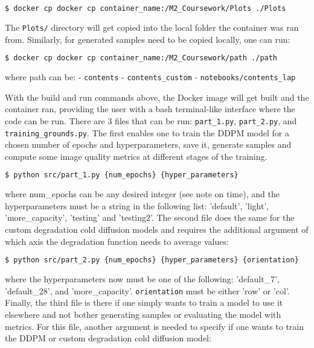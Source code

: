 \documentclass[12pt]{report} %
\begin{document}
\begin{lstlisting}[language=bash]
$ docker cp docker cp container_name:/M2_Coursework/Plots ./Plots
\end{lstlisting}

The \texttt{Plots/} directory will get copied into the local folder the container was ran from. Similarly, for generated samples need to be copied locally, one can run:

\begin{lstlisting}[language=bash]
$ docker cp docker cp container_name:/M2_Coursework/path ./path
\end{lstlisting}
where path can be:
- \texttt{contents}
- \texttt{contents\_custom}
- \texttt{notebooks/contents\_lap}


With the build and run commands above, the Docker image will get built and the container ran, providing the user with a bash terminal-like interface where the code can be run. There are 3 files that can be run: \texttt{part\_1.py}, \texttt{part\_2.py}, and \texttt{training\_grounds.py}. The first enables one to train the DDPM model for a chosen number of epochs and hyperparameters, save it, generate samples and compute some image quality metrics at different stages of the training.

\begin{lstlisting}[language=bash]
$ python src/part_1.py {num_epochs} {hyper_parameters}
\end{lstlisting}
where num\_epochs can be any desired integer (see note on time), and the hyperparameters must be a string in the following list: 'default', 'light', 'more\_capacity', 'testing' and 'testing2'. The second file does the same for the custom degradation cold diffusion models and requires the additional argument of which axis the degradation function needs to average values:

\begin{lstlisting}[language=bash]
$ python src/part_2.py {num_epochs} {hyper_parameters} {orientation}
\end{lstlisting}

where the hyperparameters now must be one of the following: 'default\_7', 'default\_28', and 'more\_capacity'. \texttt{orientation} must be either 'row' or 'col'. Finally, the third file is there if one simply wants to train a model to use it elsewhere and not bother generating samples or evaluating the model with metrics. For this file, another argument is needed to specify if one wants to train the DDPM or custom degradation cold diffusion model:
\end{document}
